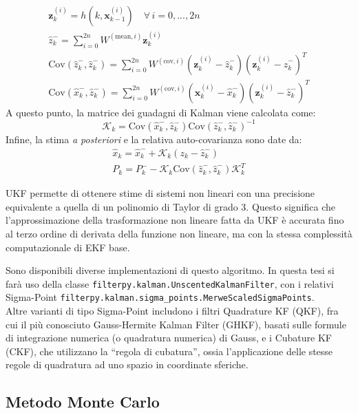 \documentclass[12pt,a4paper,openright,twoside]{book}
\begin{document}
\begin{gather*}
\mathbf{z}_k^{(i)}=h(k,\mathbf{x}_{k-1}^{(i)})\quad\forall\,i=0,...,2n \\
\hat{z}_k^-=\sum_{i=0}^{2n}W^{(\text{mean},i)}\mathbf{z}_k^{(i)} \\
\mathrm{Cov}(\hat{z}_k^-,\hat{z}_k^-)=\sum_{i=0}^{2n}W^{(\text{cov},i)}\left(\mathbf{z}_k^{(i)}-\hat{z}_k^-\right)\left(\mathbf{z}_k^{(i)}-\hat{z}_k^-\right)^T \\
\mathrm{Cov}(\hat{x}_k^-,\hat{z}_k^-)=\sum_{i=0}^{2n}W^{(\text{cov},i)}\left(\mathbf{x}_k^{(i)}-\hat{x}_k^-\right)\left(\mathbf{z}_k^{(i)}-\hat{z}_k^-\right)^T
\end{gather*}
A questo punto, la matrice dei guadagni di Kalman viene calcolata come:
\begin{equation*}
\mathcal{K}_k=\mathrm{Cov}(\hat{x}_k^-,\hat{z}_k^-)\mathrm{Cov}(\hat{z}_k^-,\hat{z}_k^-)^{-1}
\end{equation*}
Infine, la stima \textit{a posteriori} e la relativa auto-covarianza sono date da:
\begin{gather*}
\hat{x}_k=\hat{x}_k^-+\mathcal{K}_k(z_k-\hat{z}_k^-) \\
P_k=P_k^--\mathcal{K}_k\mathrm{Cov}(\hat{z}_k^-,\hat{z}_k^-)\mathcal{K}_k^T
\end{gather*}

UKF permette di ottenere stime di sistemi non lineari con una precisione equivalente a quella di un polinomio di Taylor di grado 3. Questo significa che l'approssimazione della trasformazione non lineare fatta da UKF è accurata fino al terzo ordine di derivata della funzione non lineare, ma con la stessa complessità computazionale di EKF base.

Sono disponibili diverse implementazioni di questo algoritmo. In questa tesi si farà uso della classe \lstinline{filterpy.kalman.UnscentedKalmanFilter}, con i relativi Sigma-Point \lstinline{filterpy.kalman.sigma_points.MerweScaledSigmaPoints}. \\

Altre varianti di tipo Sigma-Point includono i filtri Quadrature KF (QKF), fra cui il più conosciuto Gauss-Hermite Kalman Filter (GHKF), basati sulle formule di integrazione numerica (o quadratura numerica) di Gauss, e i Cubature KF (CKF), che utilizzano la ``regola di cubatura'', ossia l'applicazione delle stesse regole di quadratura ad uno spazio in coordinate sferiche.

\subsection{Metodo Monte Carlo}
\end{document}
